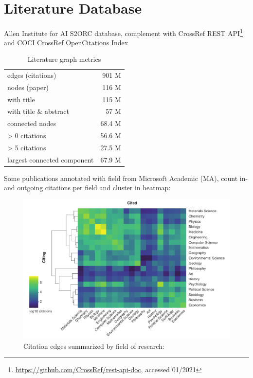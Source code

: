 \section{Literature Database}
\label{sec:state_of_art:database}

Allen Institute for AI S2ORC database, complement with CrossRef REST API\footnote{\url{https://github.com/CrossRef/rest-api-doc}, accessed 01/2021}
and COCI CrossRef OpenCitations Index


\begin{table}[ht]
	\centering
	\caption[Literature Graph Metrics]{Literature graph metrics}
	\label{tab:state_of_art:graph}
	\begin{tabular}{l|r}
		\hline
		edges (citations)           & 901 M 	\\
		nodes (paper)               & 116 M 	\\ \hline
		with title					& 115 M		\\
		with title \& abstract		&  57 M		\\ \hline
		connected nodes             &  68.4 M 	\\
		> 0 citations				&  56.6 M	\\
		> 5 citations				&  27.5 M	\\
		largest connected component &  67.9 M 	\\ \hline
	\end{tabular}
\end{table}

Some publications annotated with field from Microsoft Academic (MA), count in- and outgoing citations per field and cluster in heatmap:

\begin{figure}[h]
	\centering
	\includegraphics[width=1.0\textwidth]{figures/state_of_art/field_interactions.pdf}
	\captionsetup{format=plain}
	\caption[Scientific field interactions]{Citation edges summarized by field of research:}
	\label{fig:state_of_art:field_interactions}
\end{figure}

